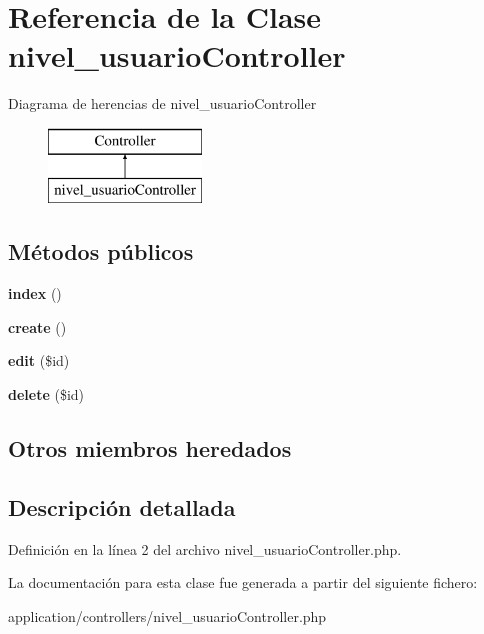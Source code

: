 \hypertarget{classnivel__usuario_controller}{}\section{Referencia de la Clase nivel\+\_\+usuario\+Controller}
\label{classnivel__usuario_controller}
Diagrama de herencias de nivel\+\_\+usuario\+Controller\begin{figure}[H]
\begin{center}
\leavevmode
\includegraphics[height=2.000000cm]{classnivel__usuario_controller}
\end{center}
\end{figure}
\subsection*{Métodos públicos}
\begin{DoxyCompactItemize}
\item 
\mbox{\label{classnivel__usuario_controller_aaf4f23e8b24d0aca5051940c03adb9c6}} 
{\bfseries index} ()
\item 
\mbox{\label{classnivel__usuario_controller_ad57b11e607a158ccbe558b930bd99d44}} 
{\bfseries create} ()
\item 
\mbox{\label{classnivel__usuario_controller_a1f1ad9d691d15db15a76624e7a84d9e2}} 
{\bfseries edit} (\$id)
\item 
\mbox{\label{classnivel__usuario_controller_a8b2223ff9dc190ff8984d558d6f82fb9}} 
{\bfseries delete} (\$id)
\end{DoxyCompactItemize}
\subsection*{Otros miembros heredados}


\subsection{Descripción detallada}


Definición en la línea 2 del archivo nivel\+\_\+usuario\+Controller.\+php.



La documentación para esta clase fue generada a partir del siguiente fichero\+:\begin{DoxyCompactItemize}
\item 
application/controllers/nivel\+\_\+usuario\+Controller.\+php\end{DoxyCompactItemize}
